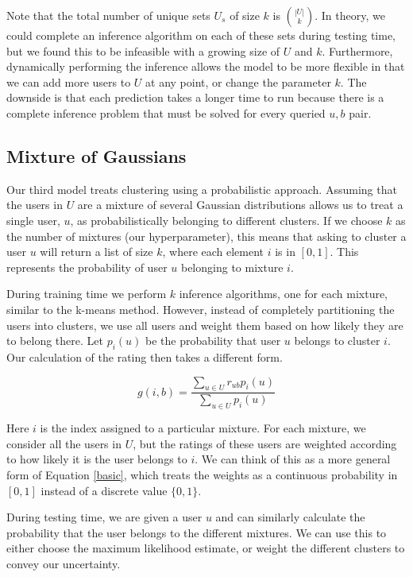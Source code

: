 \documentclass[11pt]{article}
\begin{document}
Note that the total number of unique sets $U_s$ of size $k$ is $|U| \choose k$. In theory, we could complete an inference algorithm on each of these sets during testing time, but we found this to be infeasible with a growing size of $U$ and $k$. Furthermore, dynamically performing the inference allows the model to be more flexible in that we can add more users to $U$ at any point, or change the parameter $k$. The downside is that each prediction takes a longer time to run because there is a complete inference problem that must be solved for every queried $u, b$ pair. 

\subsection{Mixture of Gaussians}
Our third model treats clustering using a probabilistic approach. Assuming that the users in $U$ are a mixture of several Gaussian distributions allows us to treat a single user, $u$, as probabilistically belonging to different clusters. If we choose $k$ as the number of mixtures (our hyperparameter), this means that asking to cluster a user $u$ will return a list of size $k$, where each element $i$ is in $[0, 1]$. This represents the probability of user $u$ belonging to mixture $i$.

During training time we perform $k$ inference algorithms, one for each mixture, similar to the k-means method. However, instead of completely partitioning the users into clusters, we use all users and weight them based on how likely they are to belong there. Let $p_i(u)$ be the probability that user $u$ belongs to cluster $i$. Our calculation of the rating then takes a different form.

\begin{equation}
\label{weighted}
g(i, b) = \frac{\sum\limits_{u \in U} r_{ub}p_i(u)}{\sum\limits_{u \in U} p_i(u)}
\end{equation}

Here $i$ is the index assigned to a particular mixture. For each mixture, we consider all the users in $U$, but the ratings of these users are weighted according to how likely it is the user belongs to $i$. We can think of this as a more general form of Equation \eqref{basic}, which treats the weights as a continuous probability in $[0, 1]$ instead of a discrete value $\{0, 1\}$.

During testing time, we are given a user $u$ and can similarly calculate the probability that the user belongs to the different mixtures. We can use this to either choose the maximum likelihood estimate, or weight the different clusters to convey our uncertainty.
\end{document}
